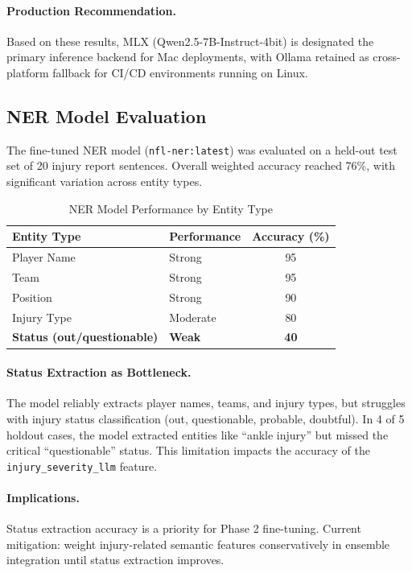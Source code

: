 \paragraph{Production Recommendation.}
Based on these results, MLX (Qwen2.5-7B-Instruct-4bit) is designated the primary inference backend for Mac deployments, with Ollama retained as cross-platform fallback for CI/CD environments running on Linux.

\subsection{NER Model Evaluation}
\label{sec:ner-evaluation}

The fine-tuned NER model (\texttt{nfl-ner:latest}) was evaluated on a held-out test set of 20 injury report sentences. Overall weighted accuracy reached 76\%, with significant variation across entity types.

\begin{table}[htbp]
\centering
\caption{NER Model Performance by Entity Type}
\label{tab:ner-accuracy}
\small
\begin{tabular}{@{} l l S[table-format=2.0] @{}}
\toprule
\textbf{Entity Type} & \textbf{Performance} & {\textbf{Accuracy (\%)}} \\
\midrule
Player Name & Strong & 95 \\
Team & Strong & 95 \\
Position & Strong & 90 \\
Injury Type & Moderate & 80 \\
\textbf{Status (out/questionable)} & \textbf{Weak} & \textbf{40} \\
\bottomrule
\end{tabular}
\end{table}

\paragraph{Status Extraction as Bottleneck.}
The model reliably extracts player names, teams, and injury types, but struggles with injury status classification (out, questionable, probable, doubtful). In 4 of 5 holdout cases, the model extracted entities like ``ankle injury'' but missed the critical ``questionable'' status. This limitation impacts the accuracy of the \texttt{injury\_severity\_llm} feature.

\paragraph{Implications.}
Status extraction accuracy is a priority for Phase 2 fine-tuning. Current mitigation: weight injury-related semantic features conservatively in ensemble integration until status extraction improves.

